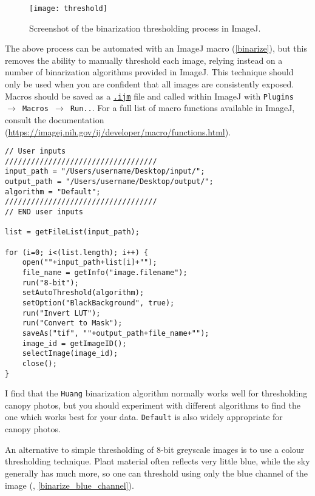 \documentclass{article}
\newcommand\menu[1]{\texttt{\color{blue}#1}}
\newcommand\file[1]{\texttt{\underline{#1}}}
\begin{document}
\begin{figure}[H]
\centering
	\texttt{[image: threshold]}
	\caption{Screenshot of the binarization thresholding process in ImageJ.}
	\label{threshold}
\end{figure}

The above process can be automated with an ImageJ macro (\autoref{binarize}), but this removes the ability to manually threshold each image, relying instead on a number of binarization algorithms provided in ImageJ. This technique should only be used when you are confident that all images are consistently exposed. Macros should be saved as a \file{.ijm} file and called within ImageJ with \menu{Plugins $\rightarrow$ Macros $\rightarrow$ Run..}. For a full list of macro functions available in ImageJ, consult the documentation (\url{https://imagej.nih.gov/ij/developer/macro/functions.html}). 

\begin{minipage}{\linewidth}
\begin{lstlisting}[label=binarize,caption=ImageJ macro to binarize all images in a nominated directory. The macro can also be found in \file{binarize.ijm} in the supplementary material.]
// User inputs
///////////////////////////////////
input_path = "/Users/username/Desktop/input/";
output_path = "/Users/username/Desktop/output/";
algorithm = "Default";
///////////////////////////////////
// END user inputs

list = getFileList(input_path);

for (i=0; i<(list.length); i++) {
	open(""+input_path+list[i]+"");
	file_name = getInfo("image.filename");
	run("8-bit");
	setAutoThreshold(algorithm);
	setOption("BlackBackground", true);
	run("Invert LUT");
	run("Convert to Mask");
	saveAs("tif", ""+output_path+file_name+"");
	image_id = getImageID();
	selectImage(image_id);
	close();
}
\end{lstlisting}
\end{minipage}

I find that the \verb|Huang| \citep{Huang1995} binarization algorithm normally works well for thresholding canopy photos, but you should experiment with different algorithms to find the one which works best for your data. \verb|Default| is also widely appropriate for canopy photos.

An alternative to simple thresholding of 8-bit greyscale images is to use a colour thresholding technique. Plant material often reflects very little blue, while the sky generally has much more, so one can threshold using only the blue channel of the image (\citealt{Brusa2014}, \autoref{binarize_blue_channel}).
\end{document}
